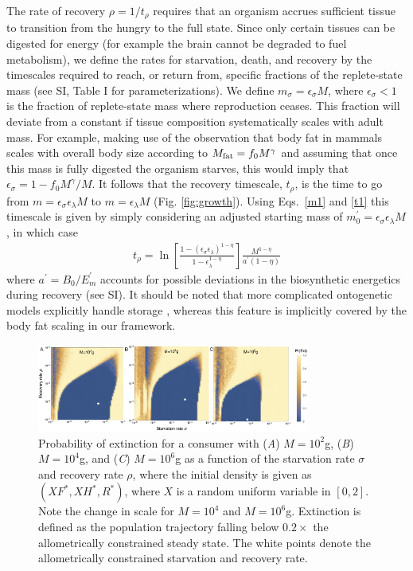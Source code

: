 \documentclass{pnastwo}
\begin{document}
\begin{article}
The rate of recovery $\rho = 1/t_\rho$ requires that an organism accrues
sufficient tissue to transition from the hungry to the full state.  Since
only certain tissues can be digested for energy (for example the brain cannot
be degraded to fuel metabolism), we define the rates for starvation, death,
and recovery by the timescales required to reach, or return from, specific
fractions of the replete-state mass (see SI, Table I for parameterizations).  We define
$m_{\sigma}=\epsilon_{\sigma} M$, where $\epsilon_{\sigma}<1$ is the fraction of
replete-state mass where reproduction ceases. This fraction will deviate from a constant
if tissue composition systematically scales with adult mass.  For example,
making use of the observation that body fat in mammals scales with overall
body size according to $M_{\rm fat}=f_{0}M^{\gamma}$ and assuming that once
this mass is fully digested the organism starves, this would imply that
$\epsilon_{\sigma}=1-f_{0}M^{\gamma}/M$. It follows that the
recovery timescale, $t_{\rho}$, is the time to go from
$m=\epsilon_{\sigma} \epsilon_{\lambda} M$ to $m=\epsilon_{\lambda}M$ (Fig. \ref{fig:growth}). Using Eqs.~\eqref{m1} and \eqref{t1} this timescale is given by simply considering an adjusted starting mass of $m_{0}^{\prime}=\epsilon_{\sigma}\epsilon_{\lambda}M$, in which case
\begin{eqnarray}
\label{rhotimescale}
t_{\rho}=\ln\left[\frac{1-\left(\epsilon_{\sigma}\epsilon_{\lambda}\right)^{1-\eta}}{1-\epsilon_\lambda^{1-\eta}}\right]\frac{M^{1-\eta}}{a^{\prime}\left(1-\eta\right)}
\end{eqnarray}
where $a^{\prime}=B_{0}/E_{m}^{\prime}$ accounts for possible deviations in the biosynthetic energetics during recovery (see SI). It should be noted that more complicated ontogenetic models explicitly handle
storage \cite{hou}, whereas this feature is implicitly covered by the body
fat scaling in our framework.

\begin{figure}
\centering
\includegraphics[width=0.8\textwidth]{fig_ExtinctionAllometricComb3.eps}
\caption{\small{ Probability of extinction for a consumer with (\emph{A}) $M=10^2$g, (\emph{B}) $M=10^4$g, and (\emph{C}) $M=10^6$g as a function of the starvation rate $\sigma$ and recovery rate $\rho$, where the initial density is given as $(XF^*,XH^*,R^*)$, where $X$ is a random uniform variable in $[0,2]$. Note the change in scale for $M=10^4$ and $M=10^6$g.  Extinction is defined as the population trajectory falling below $0.2\times$ the allometrically constrained steady state. The white points denote the allometrically constrained starvation and recovery rate.}\label{fig:ext}}
\end{figure}



\end{article}
\end{document}
